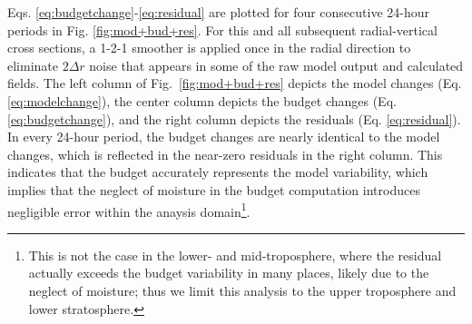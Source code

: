 \documentclass{ametsoc}
\begin{document}
Eqs. \ref{eq:budgetchange}-\ref{eq:residual} are plotted for four consecutive 24-hour periods in Fig. \ref{fig:mod+bud+res}.
For this and all subsequent radial-vertical cross sections, a 1-2-1 smoother is applied once in the radial direction to eliminate $2\Delta r$ noise that appears in some of the raw model output and calculated fields.
The left column of Fig.~\ref{fig:mod+bud+res} depicts the model changes (Eq. \ref{eq:modelchange}), the center column depicts the budget changes (Eq. \ref{eq:budgetchange}), and the right column depicts the residuals (Eq. \ref{eq:residual}).
In every 24-hour period, the budget changes are nearly identical to the model changes, which is reflected in the near-zero residuals in the right column.
This indicates that the budget accurately represents the model variability, which implies that the neglect of moisture in the budget computation introduces negligible error within the anaysis domain\footnote{This is not the case in the lower- and mid-troposphere, where the residual actually exceeds the budget variability in many places, likely due to the neglect of moisture; thus we limit this analysis to the upper troposphere and lower stratosphere.}.
\end{document}
